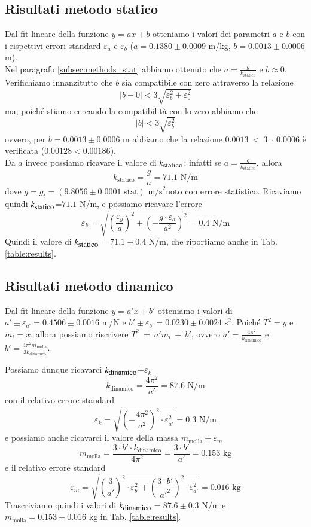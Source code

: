 \documentclass[italian, a4paper, 10pt, twocolumn]{../../style/lab_unige}
\newcommand{\reftab}[1]{Tab. {\ref{#1}}}%
\newcommand{\gLab}{$g_t=(9.8056\pm0.0001 \text{ stat}) \text{ m/s}^2$\space}
\newcommand{\ks}{$k_{\text{\small statico}}$\space}
\newcommand{\kd}{$k_{\text{\small dinamico}}$\space}
\begin{document}
{    \subsection{Risultati metodo statico}
    \label{subsec:results_sts}
    Dal fit lineare della funzione $y=ax+b$ otteniamo i valori dei parametri $a$ e $b$ con i rispettivi errori 
    standard $\varepsilon_a$ e $\varepsilon_b$ ($a = 0.1380\pm0.0009$ m/kg, $b = 0.0013\pm0.0006$ m).\\
    Nel paragrafo \ref{subsec:methods_stat} abbiamo ottenuto che $a=\frac{g}{k_{\text{statico}}}$ e $b\approx0$.
    Verifichiamo innanzitutto che $b$ sia compatibile con zero attraverso la relazione
    \[
        \left|b-0\right|<3\sqrt{\varepsilon_b^{2}+\varepsilon_0^{2}}
    \]
    ma, poiché stiamo cercando la compatibilità con lo zero abbiamo che 
    \[
        \left|b\right|<3\sqrt{\varepsilon_b^{2}}
    \]
    ovvero, per $b=0.0013\pm0.0006$ m abbiamo che la relazione $0.0013~<~3~\cdot~0.0006$ è verificata
    ($0.00128<0.00186$).\\
    Da $a$ invece possiamo ricavare il valore di \ks: infatti se $a=\frac{g}{k_{\text{statico}}}$, allora 
    \[
        k_{\text{statico}} = \frac{g}{a} = 71.1 \text{ N/m}
    \]
    dove $g=$\gLab noto con errore statistico. Ricaviamo quindi \ks=$71.1$ N/m, e possiamo ricavare l'errore 
    \[
        \varepsilon_k = \sqrt{\left(\frac{\varepsilon_g}{a}\right)^2+\left(-\frac{g\cdot\varepsilon_a}{a^2}\right)^2} = 0.4 \text{ N/m} 
    \]
    Quindi il valore di \ks$=71.1\pm0.4$ N/m, che riportiamo anche in \reftab{table:results}.%

    \subsection{Risultati metodo dinamico}
    \label{subsec:results_dyn}

    Dal fit lineare della funzione $y=a'x+b'$ otteniamo i valori di $a'\pm\varepsilon_{a'} = 0.4506\pm0.0016$ m/N
    e $b'\pm\varepsilon_{b'} = 0.0230\pm0.0024$ s$^2$.
    Poiché $T^2 = y$ e $m_i = x$, allora possiamo riscrivere $T^2~=~a'm_i~+~b'$, ovvero 
    $a' = \frac{4\pi^2}{k_{\text{dinamico}}}$ e $b' = \frac{4\pi^2m_{\text{molla}}}{3k_{\text{dinamico}}}$.

    Possiamo dunque ricavarci \kd$\pm\varepsilon_k$
    \[
        k_{\text{dinamico}} = \frac{4\pi^2}{a'} = 87.6 \text{ N/m}
    \] 
    con il relativo errore standard 
    \[
        \varepsilon_k = \sqrt{\left(-\frac{4\pi^2}{a^2}\right)^2\cdot\varepsilon_{a'}^2} = 0.3\text{ N/m}  
    \]
    e possiamo anche ricavarci il valore della massa $m_{\text{molla}}\pm\varepsilon_m$
    \[
        m_{\text{molla}} = \frac{3\cdot b'\cdot k_{\text{dinamico}}}{4\pi^2} = \frac{3\cdot b'}{a'} = 0.153 \text{ kg}
    \]
    e il relativo errore standard
    \[
        \varepsilon_m = \sqrt{\left(\frac{3}{a'}\right)^2\cdot\varepsilon_{b'}^2 + \left(\frac{3\cdot b'}{{a'}^2}\right)^2\cdot\varepsilon_{a'}^2} = 0.016 \text{ kg}
    \]
    Trascriviamo quindi i valori di \kd$ = 87.6\pm0.3$ N/m e $m_{\text{molla}} = 0.153\pm0.016$ kg in 
    \reftab{table:results}.

}
\end{document}
